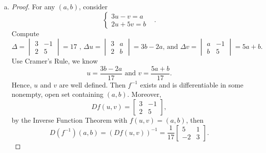 \begin{Exercise}
\begin{enumerate}[a)]
\item
\begin{proof}
For any $(a,b)$, consider
$$
\begin{cases} 
3u-v=a & \\ 
2u+5v=b &
\end{cases}.
$$
Compute
$$ 
\Delta = \begin{vmatrix}
3 & -1\\ 
2 & 5
\end{vmatrix}
= 17 \text{ , }
\Delta u = \begin{vmatrix}
3 & a \\
2 & b
\end{vmatrix}
= 3b-2a \text{, and }
\Delta v = \begin{vmatrix}
a & -1 \\
b & 5
\end{vmatrix}
= 5a+b.
$$
Use Cramer's Rule, we know 
$$
u=\frac{3b-2a}{17}\text{ and } v=\frac{5a+b}{17}.
$$
Hence, $u$ and $v$ are well defined. Then $f^{-1}$ exists and is differentiable in some nonempty, open set containing $(a,b)$. Moreover,
$$
D f(u,v) = \begin{bmatrix}
3 & -1 \\
2 & 5
\end{bmatrix},
$$
by the Inverse Function Theorem with $f(u,v) = (a,b)$, then
$$D (f^{-1}) (a,b) = \left( D f(u,v) \right)^{-1} = \frac{1}{17}\begin{bmatrix}
5 & 1 \\
-2 & 3
\end{bmatrix}.
$$
\end{proof}


\end{enumerate}
\end{Exercise}
